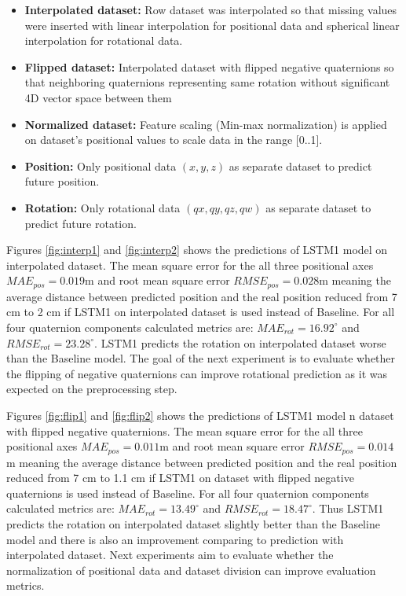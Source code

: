 \begin{itemize}
	\item \textbf{Interpolated dataset:} Row dataset was interpolated so that missing values were inserted with linear interpolation for positional data and spherical linear interpolation for rotational data. 
	\item \textbf{Flipped dataset:} Interpolated dataset with flipped negative quaternions so that neighboring quaternions representing same rotation without significant 4D vector space between them
	\item \textbf{Normalized dataset:} Feature scaling (Min-max normalization) is applied on dataset's positional values to scale data in the range [0..1]. 
	\item \textbf{Position:} Only positional data $(x, y, z)$ as separate dataset to predict future position. 
	\item \textbf{Rotation:} Only rotational data $(qx, qy, qz, qw)$ as separate dataset to predict future rotation. 
	
\end{itemize}



Figures \ref{fig:interp1} and \ref{fig:interp2} shows the predictions of LSTM1 model on interpolated dataset. The mean square error for the all three positional axes $MAE_{pos} = 0.019$m and root mean square error  $RMSE_{pos} = 0.028$m meaning the average distance between predicted position and the real position reduced from 7 cm to 2 cm if LSTM1 on interpolated dataset is used instead of Baseline. For all four quaternion components calculated metrics  are: $MAE_{rot} = 16.92^{\circ}$ and $RMSE_{rot}  =23.28^{\circ}$. LSTM1 predicts the rotation on interpolated dataset worse than the Baseline model. The goal of the next experiment is to evaluate whether the flipping of negative quaternions can improve rotational prediction as it was expected on the preprocessing step.

Figures \ref{fig:flip1} and \ref{fig:flip2} shows the predictions of LSTM1 model n dataset with flipped negative quaternions. The mean square error for the all three positional axes $MAE_{pos} = 0.011$m and root mean square error  $RMSE_{pos} = 0.014$m meaning the average distance between predicted position and the real position reduced from 7 cm to 1.1 cm if LSTM1 on dataset with flipped negative quaternions is used instead of Baseline. For all four quaternion components calculated metrics are: $MAE_{rot} = 13.49^{\circ}$ and $RMSE_{rot}  =18.47^{\circ}$. Thus LSTM1 predicts the rotation on interpolated dataset slightly better than the Baseline model and there is also an improvement comparing to prediction with interpolated dataset. Next experiments aim to evaluate whether the normalization of positional data and dataset division can improve evaluation metrics. 

